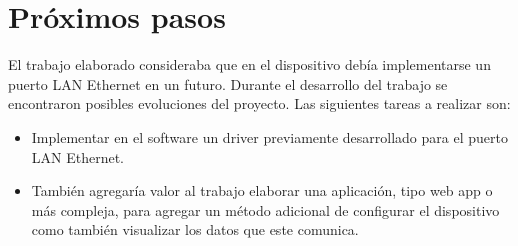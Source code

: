 \section{Próximos pasos}

El trabajo elaborado consideraba que en el dispositivo debía implementarse un puerto LAN Ethernet en un futuro. Durante el desarrollo del trabajo se encontraron posibles evoluciones del proyecto. Las siguientes tareas a realizar son:

\begin{itemize}
\item Implementar en el software un driver previamente desarrollado para el puerto LAN Ethernet.
\item También agregaría valor al trabajo elaborar una aplicación, tipo web app o más compleja, para agregar un método adicional de configurar el dispositivo como también visualizar los datos que este comunica.
\end{itemize}




